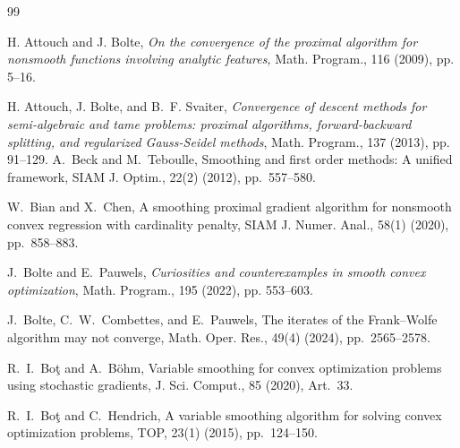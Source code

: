 \documentclass[11pt]{article}
\numberwithin{equation}{section}
\begin{document}
\begin{thebibliography}{99}

%
  H. Attouch and J. Bolte, {\em On the convergence of the proximal algorithm for nonsmooth functions involving analytic features,} Math. Program., 116 (2009), pp. 5--16.

 H.  Attouch, J. Bolte, and B.~F. Svaiter, {\em Convergence of descent methods for semi-algebraic and tame problems: proximal algorithms, forward-backward splitting, and regularized Gauss-Seidel methods}, Math. Program.,  137 (2013), pp. 91--129.
A.~Beck and M.~Teboulle,
Smoothing and first order methods: A unified framework,
SIAM J. Optim., 22(2) (2012), pp.~557--580.

W.~Bian and X.~Chen,
A smoothing proximal gradient algorithm for nonsmooth convex regression
with cardinality penalty,
SIAM J. Numer. Anal., 58(1) (2020), pp.~858--883.

J.~Bolte and E.~Pauwels,
{\em Curiosities and counterexamples in smooth convex optimization},
Math. Program., 195 (2022), pp. 553--603.



J.~Bolte, C.~W.~Combettes, and E.~Pauwels,
The iterates of the Frank--Wolfe algorithm may not converge,
Math. Oper. Res., 49(4) (2024), pp.~2565--2578.


R.~I.~Bo\c{t} and A.~B\"ohm,
Variable smoothing for convex optimization problems using stochastic
gradients,
J. Sci. Comput., 85 (2020), Art.~33.

R.~I.~Bo\c{t} and C.~Hendrich,
A variable smoothing algorithm for solving convex optimization problems,
TOP, 23(1) (2015), pp.~124--150.



\end{thebibliography}
\end{document}
